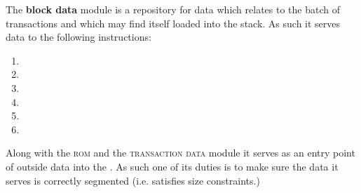 The \textbf{block data} module \btcMod{} is a repository for data which relates to the batch of transactions and which may find itself loaded into the stack.
As such it serves data to the following instructions:
\begin{multicols}{3}
\begin{enumerate}
	\item {}
	\item {}
	\item {}
	\item {}
	\item {}
	\item {}
\end{enumerate}
\end{multicols}
Along with the \textsc{rom} and the \textsc{transaction data} module it serves as an entry point of outside data into the \zkEvm{}.
As such one of its duties is to make sure the data it serves is correctly segmented (i.e. satisfies size constraints.)
